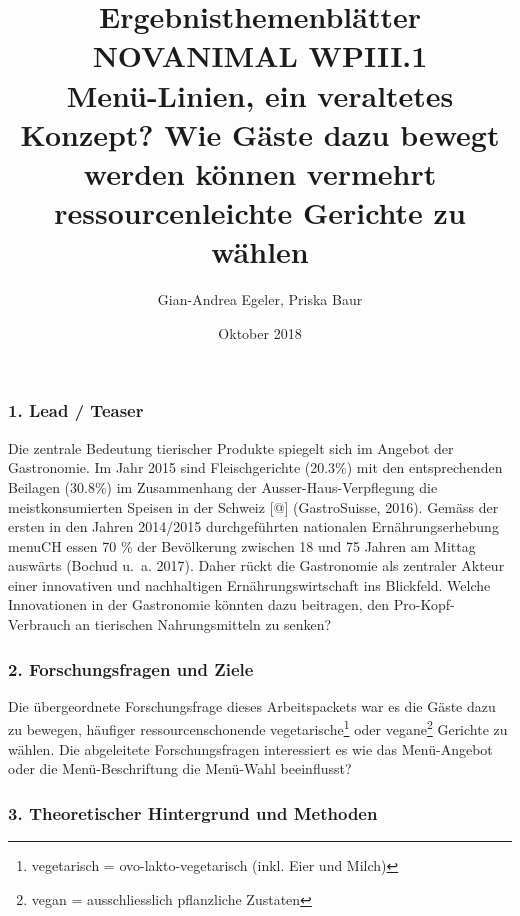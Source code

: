 \documentclass[12pt,ngerman,]{article}
\title{Ergebnisthemenblätter NOVANIMAL WPIII.1\\
Menü-Linien, ein veraltetes Konzept? Wie Gäste dazu bewegt werden können
vermehrt ressourcenleichte Gerichte zu wählen}
\author{Gian-Andrea Egeler, Priska Baur}
\date{Oktober 2018}
\let\rmarkdownfootnote\footnote%
\def\footnote{\protect\rmarkdownfootnote}
\begin{document}
\maketitle

\hypertarget{lead-teaser}{%
\subsubsection{1. Lead / Teaser}\label{lead-teaser}}

Die zentrale Bedeutung tierischer Produkte spiegelt sich im Angebot der
Gastronomie. Im Jahr 2015 sind Fleischgerichte (20.3\%) mit den
entsprechenden Beilagen (30.8\%) im Zusammenhang der
Ausser-Haus-Verpflegung die meistkonsumierten Speisen in der Schweiz
{[}@{]} (GastroSuisse, 2016). Gemäss der ersten in den Jahren 2014/2015
durchgeführten nationalen Ernährungserhebung menuCH essen 70 \% der
Bevölkerung zwischen 18 und 75 Jahren am Mittag auswärts (Bochud u.~a.
2017). Daher rückt die Gastronomie als zentraler Akteur einer
innovativen und nachhaltigen Ernährungswirtschaft ins Blickfeld. Welche
Innovationen in der Gastronomie könnten dazu beitragen, den
Pro-Kopf-Verbrauch an tierischen Nahrungsmitteln zu senken?

\hypertarget{forschungsfragen-und-ziele}{%
\subsubsection{2. Forschungsfragen und
Ziele}\label{forschungsfragen-und-ziele}}

Die übergeordnete Forschungsfrage dieses Arbeitspackets war es die Gäste
dazu zu bewegen, häufiger ressourcenschonende vegetarische\footnote{vegetarisch
  = ovo-lakto-vegetarisch (inkl. Eier und Milch)} oder vegane\footnote{vegan
  = ausschliesslich pflanzliche Zustaten} Gerichte zu wählen. Die
abgeleitete Forschungsfragen interessiert es wie das Menü-Angebot oder
die Menü-Beschriftung die Menü-Wahl beeinflusst?

\hypertarget{theoretischer-hintergrund-und-methoden}{%
\subsubsection{3. Theoretischer Hintergrund und
Methoden}\label{theoretischer-hintergrund-und-methoden}}
\end{document}
